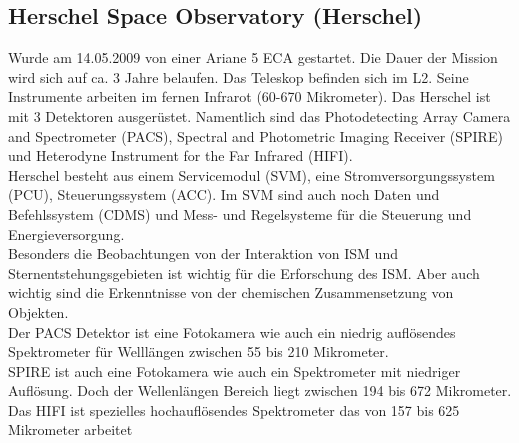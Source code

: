 \subsection{Herschel Space Observatory (Herschel)}
Wurde am 14.05.2009 von einer Ariane 5 ECA gestartet. Die Dauer der Mission wird sich auf ca. 3 Jahre belaufen. Das Teleskop befinden sich im L2. Seine Instrumente arbeiten im fernen Infrarot (60-670 Mikrometer). Das Herschel ist mit 3 Detektoren ausgerüstet. Namentlich sind das Photodetecting Array Camera and Spectrometer (PACS), Spectral and Photometric Imaging Receiver (SPIRE) und Heterodyne Instrument for the Far Infrared (HIFI).\\
Herschel besteht aus einem Servicemodul (SVM), eine Stromversorgungssystem (PCU), Steuerungssystem (ACC). Im SVM sind auch noch Daten und  Befehlssystem (CDMS) und Mess- und Regelsysteme für die Steuerung und Energieversorgung.\\
Besonders die Beobachtungen von der Interaktion von ISM und Sternentstehungsgebieten ist wichtig für die Erforschung des ISM. Aber auch wichtig sind die Erkenntnisse von der chemischen Zusammensetzung von Objekten.\\
Der PACS Detektor ist eine Fotokamera wie auch ein niedrig auflösendes Spektrometer für Welllängen zwischen 55 bis 210 Mikrometer.\\
SPIRE ist auch eine Fotokamera wie auch ein Spektrometer mit niedriger Auflösung. Doch der Wellenlängen Bereich liegt zwischen 194 bis 672 Mikrometer.\\
Das HIFI ist spezielles hochauflösendes Spektrometer das von 157 bis 625 Mikrometer arbeitet
